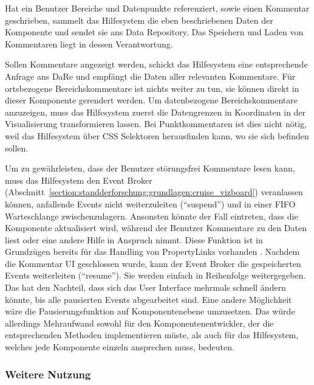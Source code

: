 \documentclass[
	headsepline,
	footsepline,
	fontsize=12pt,
	bibliography=totoc
]{scrbook}
\begin{document}

Hat ein Benutzer Bereiche und Datenpunkte referenziert, sowie einen Kommentar geschrieben, sammelt das Hilfesystem die eben beschriebenen Daten der Komponente und sendet sie ans Data Repository. Das Speichern und Laden von Kommentaren liegt in dessen Verantwortung. 


Sollen Kommentare angezeigt werden, schickt das Hilfesystem eine entsprechende Anfrage ans DaRe und empfängt die Daten aller relevanten Kommentare. Für ortsbezogene Bereichskommentare ist nichts weiter zu tun, sie können direkt in dieser Komponente gerendert werden. Um datenbezogene Bereichskommentare anzuzeigen, muss das Hilfesystem zuerst die Datengrenzen in Koordinaten in der Visualisierung transformieren lassen. Bei Punktkommentaren ist dies nicht nötig, weil das Hilfesystem über CSS Selektoren herausfinden kann, wo sie sich befinden sollen.


Um zu gewährleisten, dass der Benutzer störungsfrei Kommentare lesen kann, muss das Hilfesystem den Event Broker (Abschnitt~\ref{section:standderforschung:grundlagen:cruise_vizboard}) veranlassen können, anfallende Events nicht weiterzuleiten (\enquote{suspend}) und in einer FIFO Warteschlange zwischenzulagern. Ansonsten könnte der Fall eintreten, dass die Komponente aktualisiert wird, während der Benutzer Kommentare zu den Daten liest oder eine andere Hilfe in Anspruch nimmt. Diese Funktion ist in Grundzügen bereits für das Handling von PropertyLinks vorhanden \cite[S. 161]{Pietschmann2012}. Nachdem die Kommentar UI geschlossen wurde, kann der Event Broker die gespeicherten Events weiterleiten (\enquote{resume}). Sie werden einfach in Reihenfolge weitergegeben. Das hat den Nachteil, dass sich das User Interface mehrmals schnell ändern könnte, bis alle pausierten Events abgearbeitet sind. Eine andere Möglichkeit wäre die Pausierungsfunktion auf Komponentenebene umzusetzen. Das würde allerdings Mehraufwand sowohl für den Komponentenentwickler, der die entsprechenden Methoden implementieren müste, als auch für das Hilfesystem, welches jede Komponente einzeln ansprechen muss, bedeuten.

\subsubsection{Weitere Nutzung}
\end{document}

